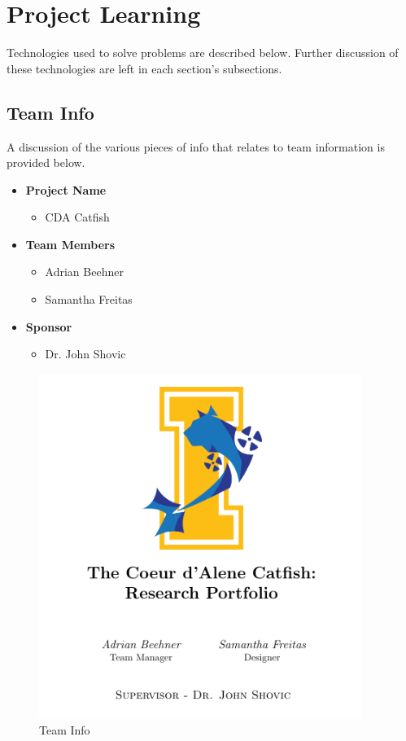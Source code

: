 \documentclass[12pt]{article}
\begin{document}
	\section{Project Learning}
	Technologies used to solve problems are described below. Further discussion of these technologies are left in each section's subsections.
	
		\subsection{Team Info}
		A discussion of the various pieces of info that relates to team information is provided below.
		
		{\renewcommand\labelitemi{}
			\begin{itemize}
				\item \textbf{Project Name}
				\begin{itemize}
					\item CDA Catfish
				\end{itemize}
				\item \textbf{Team Members}
				\begin{itemize}
					\item Adrian Beehner
					\item Samantha Freitas
				\end{itemize}
				\item \textbf{Sponsor}
				\begin{itemize}
					\item Dr. John Shovic
				\end{itemize}
			\end{itemize}
		
		\begin{figure}[!htb]
			\centering
			\includegraphics[width=105mm]{assets/Team_Info.png}
			\caption{Team Info \label{overflow}}
		\end{figure}
		}	
		
\end{document}
